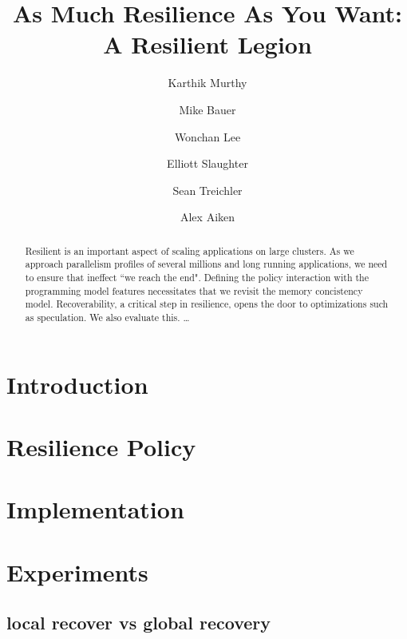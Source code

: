 \documentclass{llncs}
\begin{document}
\mainmatter              %
%
\title{As Much Resilience As You Want: \\A Resilient Legion}
%
 
\author{Karthik Murthy \and
Mike Bauer \and 
Wonchan Lee \and
Elliott Slaughter \and
Sean Treichler \and
Alex Aiken
}
%

\maketitle              %

\begin{abstract} 
Resilient is an important aspect of scaling applications on
large clusters. As we approach parallelism profiles of several millions and long running applications, we need to ensure that ineffect ``we reach the end".
Defining the policy interaction with the programming model features necessitates that we revisit the memory concistency model. 
Recoverability, a critical step in
resilience, opens the door to optimizations such as speculation. We also
evaluate this.  \dots
{}
\end{abstract}

%
\section{Introduction}

\section{Resilience Policy}



\section{Implementation}

\section{Experiments}

\subsection{local recover vs global recovery}
\end{document}
